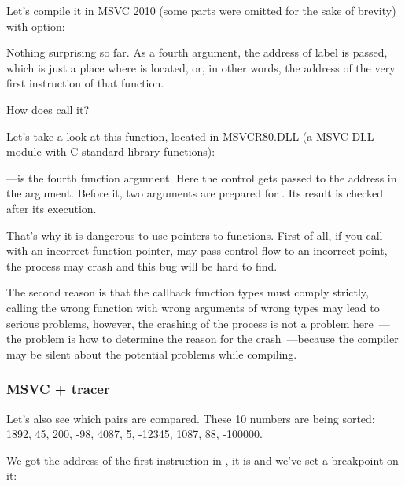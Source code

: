 Let's compile it in MSVC 2010 (some parts were omitted for the sake of brevity) with \TT{\Ox} option:



Nothing surprising so far.
As a fourth argument, the address of label  is passed, which is just a place
where \comp is located, or, in other words, the address of the very first instruction of 
that function.

How does \qsort call it?


Let's take a look at this function, located in MSVCR80.DLL (a MSVC DLL module with C standard library functions):



---is the fourth function argument.
Here the control gets passed to the address in the  argument.
Before it, two arguments are prepared for \comp. Its result is checked after its execution.

That's why it is dangerous to use pointers to functions.
First of all, if you call \qsort with an incorrect function pointer, \qsort may pass control flow
to an incorrect point, the process may crash and this bug will be hard to find.

The second reason is that the callback function types must comply strictly, calling the wrong function
with wrong arguments of wrong types may lead to serious problems, however, the crashing of the process is not a 
problem here~---the problem is how to determine the reason for the crash~---because the compiler may be 
silent about the potential problems while compiling.



\subsubsection{MSVC + tracer}

Let's also see which pairs are compared.
These 10 numbers are being sorted: 
1892, 45, 200, -98, 4087, 5, -12345, 1087, 88, -100000.

We got the address of the first \CMP instruction in \comp, it is  and we've set a breakpoint on it:

